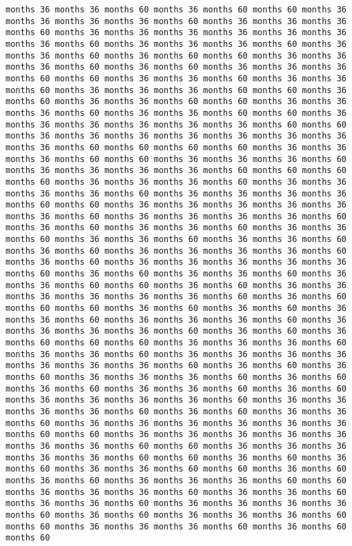 \documentclass[11pt]{article}
\begin{document}
\begin{Verbatim}[commandchars=\\\{\}, frame=single, framerule=2mm, rulecolor=\color{outerrorbackground}]
months 36 months 36 months 60 months 36 months 60 months 60 months 36 months 36 months 36 months 36 months 60 months 36 months 36 months 36 months 60 months 36 months 36 months 36 months 36 months 36 months 36 months 36 months 60 months 36 months 36 months 36 months 60 months 36 months 36 months 60 months 36 months 60 months 60 months 36 months 36 months 36 months 60 months 36 months 60 months 36 months 36 months 36 months 60 months 60 months 36 months 36 months 60 months 36 months 36 months 60 months 36 months 36 months 36 months 60 months 60 months 36 months 60 months 36 months 36 months 60 months 60 months 36 months 36 months 36 months 60 months 36 months 36 months 60 months 60 months 36 months 36 months 36 months 36 months 36 months 36 months 60 months 60 months 36 months 36 months 36 months 36 months 36 months 36 months 36 months 36 months 60 months 60 months 60 months 60 months 36 months 36 months 36 months 60 months 60 months 36 months 36 months 36 months 60 months 36 months 36 months 36 months 36 months 60 months 60 months 60 months 60 months 36 months 36 months 36 months 60 months 36 months 36 months 36 months 36 months 60 months 36 months 36 months 36 months 36 months 60 months 60 months 36 months 36 months 36 months 36 months 36 months 36 months 60 months 36 months 36 months 36 months 36 months 60 months 36 months 60 months 36 months 36 months 60 months 36 months 36 months 60 months 36 months 36 months 60 months 36 months 36 months 60 months 36 months 60 months 36 months 36 months 36 months 36 months 60 months 36 months 60 months 36 months 36 months 36 months 36 months 36 months 60 months 36 months 60 months 36 months 36 months 60 months 36 months 36 months 60 months 60 months 36 months 60 months 36 months 36 months 36 months 36 months 36 months 36 months 60 months 36 months 60 months 60 months 60 months 36 months 60 months 36 months 60 months 36 months 36 months 60 months 36 months 36 months 36 months 60 months 36 months 36 months 36 months 36 months 60 months 36 months 60 months 36 months 60 months 60 months 60 months 36 months 36 months 36 months 60 months 36 months 36 months 60 months 36 months 36 months 36 months 36 months 36 months 36 months 36 months 60 months 36 months 60 months 36 months 60 months 36 months 36 months 36 months 60 months 36 months 60 months 36 months 60 months 36 months 36 months 60 months 36 months 60 months 36 months 36 months 36 months 36 months 60 months 36 months 36 months 36 months 36 months 60 months 36 months 60 months 36 months 36 months 60 months 36 months 36 months 36 months 36 months 36 months 36 months 60 months 60 months 36 months 36 months 36 months 36 months 36 months 36 months 36 months 60 months 60 months 36 months 36 months 36 months 36 months 36 months 60 months 60 months 36 months 60 months 36 months 60 months 36 months 36 months 60 months 60 months 36 months 60 months 36 months 60 months 36 months 36 months 36 months 60 months 60 months 36 months 36 months 36 months 60 months 36 months 36 months 60 months 36 months 36 months 60 months 36 months 36 months 36 months 36 months 60 months 36 months 60 months 36 months 36 months 36 months 60 months 60 months 36 months 36 months 36 months 60 months 36 months 60 months 60 
\end{Verbatim}
\end{document}
